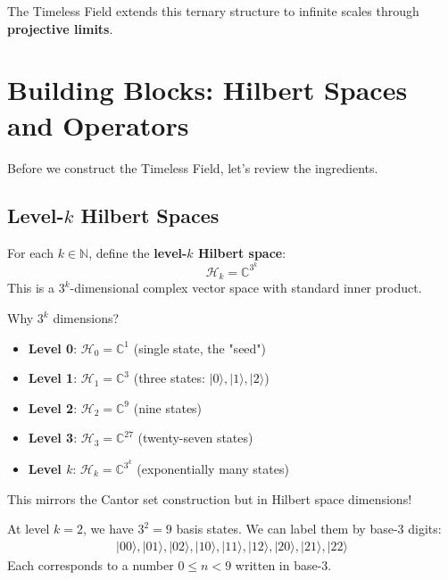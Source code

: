 The Timeless Field extends this ternary structure to infinite scales through \textbf{projective limits}.

\section{Building Blocks: Hilbert Spaces and Operators}
\label{sec:building-blocks}

Before we construct the Timeless Field, let's review the ingredients.

\subsection{Level-\texorpdfstring{$k$}{k} Hilbert Spaces}

\begin{defn}\label{def:level-k-hilbert}
For each $k \in \mathbb{N}$, define the \textbf{level-$k$ Hilbert space}:
\begin{equation}
\mathcal{H}_k = \mathbb{C}^{3^k}
\end{equation}
This is a $3^k$-dimensional complex vector space with standard inner product.
\end{defn}

\begin{intuitive}
Why $3^k$ dimensions?
\begin{itemize}
\item \textbf{Level 0}: $\mathcal{H}_0 = \mathbb{C}^1$ (single state, the "seed")
\item \textbf{Level 1}: $\mathcal{H}_1 = \mathbb{C}^3$ (three states: $|0\rangle, |1\rangle, |2\rangle$)
\item \textbf{Level 2}: $\mathcal{H}_2 = \mathbb{C}^9$ (nine states)
\item \textbf{Level 3}: $\mathcal{H}_3 = \mathbb{C}^{27}$ (twenty-seven states)
\item \textbf{Level $k$}: $\mathcal{H}_k = \mathbb{C}^{3^k}$ (exponentially many states)
\end{itemize}

This mirrors the Cantor set construction but in Hilbert space dimensions!
\end{intuitive}

\begin{example}
At level $k=2$, we have $3^2 = 9$ basis states. We can label them by base-3 digits:
\begin{align*}
|00\rangle, |01\rangle, |02\rangle, |10\rangle, |11\rangle, |12\rangle, |20\rangle, |21\rangle, |22\rangle
\end{align*}
Each corresponds to a number $0 \leq n < 9$ written in base-3.
\end{example}

